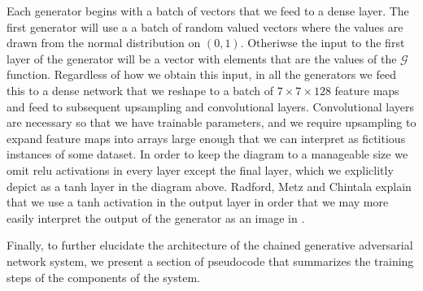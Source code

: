 \documentclass[conference]{IEEEtran}
\begin{document}
Each generator begins with a batch of vectors that we feed to a dense layer.
The first generator will use a a batch of random valued vectors where the values
are drawn from the normal distribution on $\left(0, 1\right)$. Otheriwse the
input to the first layer of the generator will be a vector with elements that
are the values of the $\mathcal{G}$ function.  Regardless of how we obtain this
input, in all the generators we feed this to a dense network that we reshape 
to a batch of $7\times7\times128$ feature maps and feed to subsequent upsampling
and convolutional layers.  Convolutional layers are necessary so that we have
trainable parameters, and we require upsampling to expand feature maps into
arrays large enough that we can interpret as fictitious instances of some
dataset. In order to keep the diagram to a manageable size we omit relu
activations in every layer except the final layer, which we expliclitly depict
as a tanh layer in the diagram above.  Radford, Metz and Chintala explain that
we use a tanh activation in the output layer in order that we may more easily
interpret the output of the generator as an image in \cite{repLearnDcgan}. 

Finally, to further elucidate the architecture of the chained generative
adversarial network system, we present a section of pseudocode that summarizes
the training steps of the components of the system.
\end{document}
